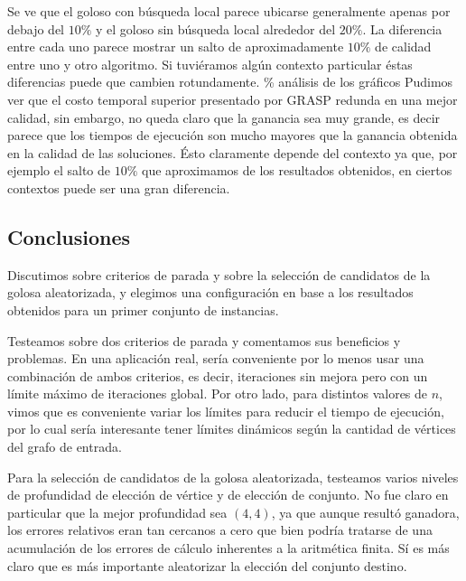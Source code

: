 Se ve que el goloso con búsqueda local parece ubicarse generalmente apenas por debajo del $10\%$ y 
el goloso sin búsqueda local alrededor del $20\%$. La diferencia entre cada uno parece mostrar
un salto de aproximadamente $10\%$ de calidad entre uno y otro algoritmo. Si tuviéramos algún 
contexto particular éstas diferencias puede que cambien rotundamente.
\% análisis de los gráficos
Pudimos ver que el costo temporal superior presentado por GRASP redunda en una mejor calidad, 
sin embargo, no queda claro que la ganancia sea muy grande, es decir parece que los tiempos
de ejecución son mucho mayores que la ganancia obtenida en la calidad de las soluciones. Ésto
claramente depende del contexto ya que, por ejemplo el salto de $10\%$ que aproximamos de los
resultados obtenidos, en ciertos contextos puede ser una gran diferencia.


\subsection{Conclusiones}

Discutimos sobre criterios de parada y sobre la selección de candidatos de la golosa aleatorizada, y elegimos una configuración en base a los resultados obtenidos para un primer conjunto de instancias.

Testeamos sobre dos criterios de parada y comentamos sus beneficios y problemas. En una aplicación real, sería conveniente por lo menos usar una combinación de ambos criterios, es decir, iteraciones sin mejora pero con un límite máximo de iteraciones global. Por otro lado, para distintos valores de $n$, vimos que es conveniente variar los límites para reducir el tiempo de ejecución, por lo cual sería interesante tener límites dinámicos según la cantidad de vértices del grafo de entrada.

Para la selección de candidatos de la golosa aleatorizada, testeamos varios niveles de profundidad de elección de vértice y de elección de conjunto. No fue claro en particular que la mejor profundidad sea $(4,4)$, ya que aunque resultó ganadora, los errores relativos eran tan cercanos a cero que bien podría tratarse de una acumulación de los errores de cálculo inherentes a la aritmética finita. Sí es más claro que es más importante aleatorizar la elección del conjunto destino.

